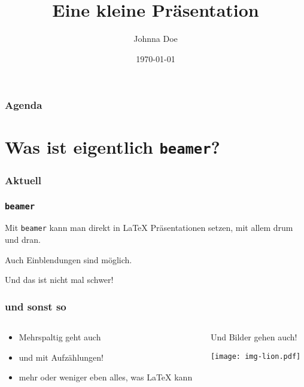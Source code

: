 \documentclass{beamer}
\begin{document}
\title{Eine kleine Präsentation}
\author{Johnna Doe}
\date{1970-01-01}

\begin{frame}
  \maketitle
\end{frame}

\begin{frame}
  \frametitle{Agenda}
  \tableofcontents{}
\end{frame}

\section{Was ist eigentlich \texttt{beamer}?}

\begin{frame}
  \frametitle{Aktuell}
  \tableofcontents[currentsection]{}
\end{frame}

\begin{frame}
  \frametitle{\texttt{beamer}}

  \onslide<+->

  Mit \texttt{beamer} kann man direkt in \LaTeX{} Präsentationen setzen, mit
  allem drum und dran.

  \onslide<+->

  \bigskip{}

  Auch Einblendungen sind möglich.

  \onslide<+->

  \bigskip{}

  Und das ist nicht mal schwer!

\end{frame}

\begin{frame}
  \frametitle{und sonst so}

  \onslide<+->

  \begin{columns}
    \begin{column}{0.45\linewidth}
      \begin{itemize}
      \item<+-> Mehrspaltig geht auch
      \item<+-> und mit Aufzählungen!
      \item<+-> mehr oder weniger eben alles, was \LaTeX{} kann
      \end{itemize}
    \end{column}

    \begin{column}{0.45\linewidth}
      \onslide<+->

      Und Bilder gehen auch!

      \begin{center}
        \texttt{[image: img-lion.pdf]}
      \end{center}

    \end{column}
  \end{columns}

\end{frame}
\end{document}

